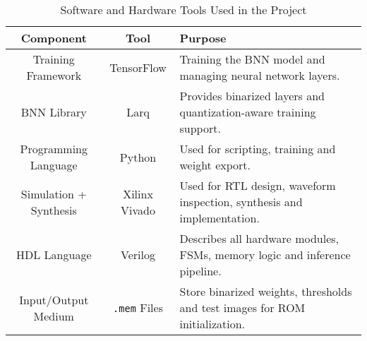 \documentclass[a4paper,12pt]{report}
\begin{document}
\clearpage
\begin{table}[htbp]
    \centering
    \begin{tabular}{|c|c|p{7.5cm}|}
        \hline
        \textbf{Component} & \textbf{Tool} & \textbf{Purpose} \\
        \hline
        Training Framework & TensorFlow & Training the BNN model and managing neural network layers. \\
        \hline
        BNN Library & Larq & Provides binarized layers and quantization-aware training support. \\
        \hline
        Programming Language & Python & Used for scripting, training and weight export. \\
        \hline
        Simulation + Synthesis & Xilinx Vivado & Used for RTL design, waveform inspection, synthesis and implementation. \\
        \hline
        HDL Language & Verilog & Describes all hardware modules, FSMs, memory logic and inference pipeline. \\
        \hline
        Input/Output Medium & \texttt{.mem} Files & Store binarized weights, thresholds and test images for ROM initialization. \\
        \hline
    \end{tabular}
    \vspace{0.5\baselineskip}
    \caption{Software and Hardware Tools Used in the Project}
    \label{table:toolchain_summary}
\end{table}
\end{document}
